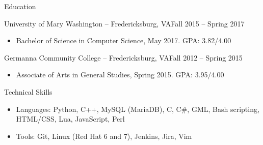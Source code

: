 \documentclass[calibri]{mcdowellcv}
\begin{document}
	\begin{cvsection}{Education}
		\begin{cvsubsection}{University of Mary Washington -- Fredericksburg, VA}{Fall 2015 -- Spring 2017}
			\begin{itemize}
				\item Bachelor of Science in Computer Science, May 2017. GPA: 3.82/4.00
			\end{itemize}
		\end{cvsubsection}
		\begin{cvsubsection}{Germanna Community College -- Fredericksburg, VA}{Fall 2012 -- Spring 2015}
			\begin{itemize}
				\item Associate of Arts in General Studies, Spring 2015. GPA: 3.95/4.00
			\end{itemize}
		\end{cvsubsection}
	\end{cvsection}
	
	\begin{cvsection}{Technical Skills}
		\begin{cvsubsection}{}{}{}	
			\begin{itemize}
				\item Languages: Python, C++, MySQL (MariaDB), C, C\#, GML, Bash scripting, HTML/CSS, Lua, JavaScript, Perl 
				\item Tools: Git, Linux (Red Hat 6 and 7), Jenkins, Jira, Vim
			\end{itemize}
		\end{cvsubsection}
	\end{cvsection}
	
\end{document}
